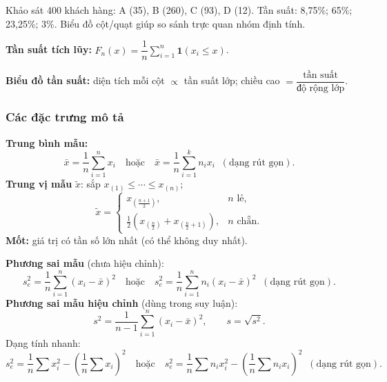 \documentclass[12pt,a4paper]{article}
\begin{document}
\begin{vidu}[title={Biểu đồ - xếp hạng sản phẩm}]
Khảo sát 400 khách hàng: A (35), B (260), C (93), D (12). Tần suất: 8{,}75\%; 65\%; 23{,}25\%; 3\%. Biểu đồ cột/quạt giúp so sánh trực quan nhóm định tính.
\end{vidu}

\begin{congthuc}[title={Biểu đồ tần suất}]
  \textbf{Tần suất tích lũy:} $F_n(x) = \dfrac{1}{n}\displaystyle\sum_{i=1}^n \mathbf{1}(x_i \le x)$.
  
  \textbf{Biểu đồ tần suất:} diện tích mỗi cột $\propto$ tần suất lớp; chiều cao $= \dfrac{\text{tần suất}}{\text{độ rộng lớp}}$.
\end{congthuc}

\subsubsection{Các đặc trưng mô tả}

\begin{congthuc}[title={Vị trí trung tâm - mẫu quan sát}]
  \textbf{Trung bình mẫu:}
  \[
    \bar{x} = \dfrac{1}{n}\displaystyle\sum_{i=1}^n x_i
    \quad\text{hoặc}\quad
    \bar{x} = \dfrac{1}{n}\displaystyle\sum_{i=1}^k n_i x_i \;\;(\text{dạng rút gọn}).
  \]
  \textbf{Trung vị mẫu} $\tilde{x}$: sắp $x_{(1)} \le \cdots \le x_{(n)}$;
  \[
    \tilde{x} =
    \begin{cases}
      x_{(\frac{n+1}{2})}, & n \text{ lẻ},\\[4pt]
      \tfrac{1}{2}(x_{(\frac{n}{2})} + x_{(\frac{n}{2}+1)}), & n \text{ chẵn}.
    \end{cases}
  \]
  \textbf{Mốt:} giá trị có tần số lớn nhất (có thể không duy nhất).
\end{congthuc}

\begin{congthuc}[title={Phân tán - phương sai và độ lệch chuẩn mẫu}]
  \textbf{Phương sai mẫu} (chưa hiệu chỉnh):
  \[
    s_e^2 = \dfrac{1}{n}\displaystyle\sum_{i=1}^n (x_i - \bar{x})^2
    \quad\text{hoặc}\quad
    s_e^2 = \dfrac{1}{n}\displaystyle\sum_{i=1}^n n_i(x_i - \bar{x})^2 \;\;(\text{dạng rút gọn}).
  \]
  \textbf{Phương sai mẫu hiệu chỉnh} (dùng trong suy luận):
  \[
    s^2 = \dfrac{1}{n-1}\displaystyle\sum_{i=1}^n (x_i - \bar{x})^2, \qquad s = \sqrt{s^2}.
  \]
  Dạng tính nhanh: 
  \[
    s_e^2 = \dfrac{1}{n}\displaystyle\sum x_i^2 - \left(\dfrac{1}{n}\displaystyle\sum x_i\right)^2
    \quad\text{hoặc}\quad
    s_e^2 = \dfrac{1}{n}\displaystyle\sum n_i x_i^2 - \left(\dfrac{1}{n}\displaystyle\sum n_i x_i\right)^2 \;\;(\text{dạng rút gọn}).
  \]
\end{congthuc}
\end{document}
